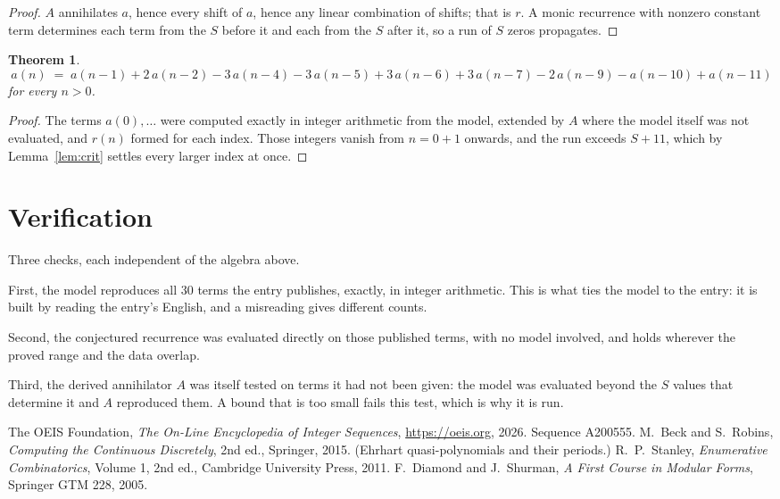 \documentclass[11pt,a4paper]{article}
\theoremstyle{plain}
\newtheorem{theorem}{Theorem}
\theoremstyle{definition}
\begin{document}
\begin{proof}
$A$ annihilates $a$, hence every shift of $a$, hence any linear combination of shifts; that is
$r$. A monic recurrence with nonzero constant term determines each term from the $S$ before it
and each from the $S$ after it, so a run of $S$ zeros propagates.
\end{proof}

\begin{theorem}
\[
a(n)\;=\;a(n-1) + 2\,a(n-2) - 3\,a(n-4) - 3\,a(n-5) + 3\,a(n-6) + 3\,a(n-7) - 2\,a(n-9) - a(n-10) + a(n-11)
\]
for every $n>0$.
\end{theorem}

\begin{proof}
The terms $a(0),\dots$ were computed exactly in integer arithmetic from the model, extended by
$A$ where the model itself was not evaluated, and $r(n)$ formed for each index. Those integers
vanish from $n=0+1$ onwards, and the run exceeds $S+11$, which by
Lemma~\ref{lem:crit} settles every larger index at once.
\end{proof}

\section{Verification}

Three checks, each independent of the algebra above.

First, the model reproduces all $30$ terms the entry publishes, exactly, in integer
arithmetic. This is what ties the model to the entry: it is built by reading the entry's
English, and a misreading gives different counts.

Second, the conjectured recurrence was evaluated directly on those published terms, with no
model involved, and holds wherever the proved range and the data overlap.

Third, the derived annihilator $A$ was itself tested on terms it had not been given: the model
was evaluated beyond the $S$ values that determine it and $A$ reproduced them. A bound that is
too small fails this test, which is why it is run.

\begin{thebibliography}{9}
 The OEIS Foundation, \emph{The On-Line Encyclopedia of Integer
Sequences}, \url{https://oeis.org}, 2026. Sequence A200555.
 M.~Beck and S.~Robins, \emph{Computing the Continuous Discretely},
2nd ed., Springer, 2015. (Ehrhart quasi-polynomials and their periods.)
 R.~P.~Stanley, \emph{Enumerative Combinatorics}, Volume 1, 2nd ed.,
Cambridge University Press, 2011.
 F.~Diamond and J.~Shurman, \emph{A First Course in Modular Forms},
Springer GTM 228, 2005.
\end{thebibliography}
\end{document}
